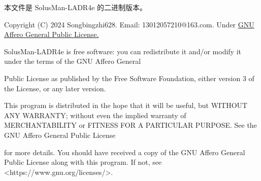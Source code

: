%
%
%
%

\def\allfiles{}





\small
\centerline{\large 本文件是 SolusMan-LADR4e 的二进制版本。}\par
Copyright (C) 2024 Songbingzhi628. Email: 13012057210@163.com.\;\;\; Under \href{run:./COPYING}{GNU Affero General Public License.}\par
SolusMan-LADR4e is free software: you can redistribute it and/or modify it under the terms of the GNU Affero General\par
Public License as published by the Free Software Foundation, either version 3 of the License, or any later version.\par
This program is distributed in the hope that it will be useful, but WITHOUT ANY WARRANTY; without even the implied warranty of MERCHANTABILITY or FITNESS FOR A PARTICULAR PURPOSE. See the GNU Affero General Public License\par
for more details. You should have received a copy of the GNU Affero General Public License along with this program. If not, see <https://www.gnu.org/licenses/>.\par
\SepLine

